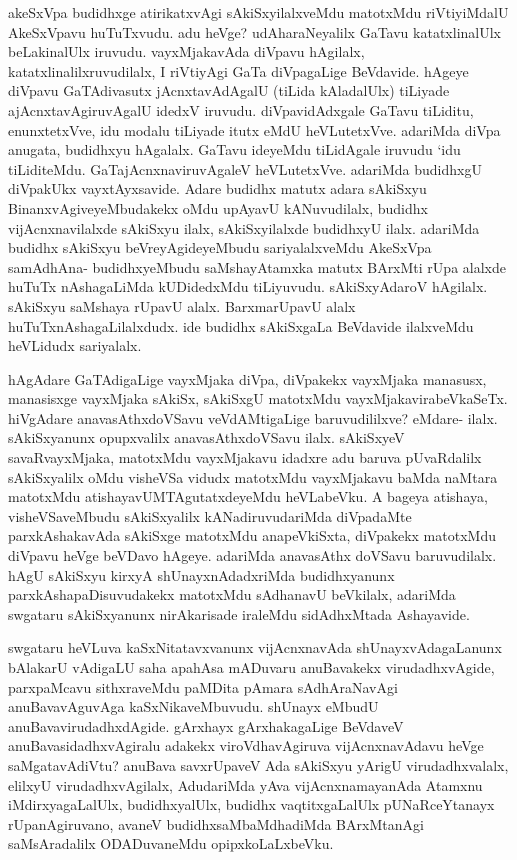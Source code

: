 \begin{artha}
akeSxVpa budidhxge atirikatxvAgi sAkiSxyilalxveMdu matotxMdu riVtiyiMdalU AkeSxVpavu huTuTxvudu. adu heVge? udAharaNeyalilx GaTavu katatxlinalUlx beLakinalUlx iruvudu. vayxMjakavAda diVpavu hAgilalx, katatxlinalilxruvudilalx, I riVtiyAgi GaTa diVpagaLige BeVdavide. hAgeye diVpavu GaTAdivasutx jAcnxtavAdAgalU (tiLida kAladalUlx) tiLiyade ajAcnxtavAgiruvAgalU idedxV iruvudu. diVpavidAdxgale GaTavu tiLiditu, enunxtetxVve, idu modalu tiLiyade itutx eMdU heVLutetxVve. adariMda diVpa anugata, budidhxyu hAgalalx. GaTavu ideyeMdu tiLidAgale iruvudu `idu tiLiditeMdu. GaTajAcnxnaviruvAgaleV heVLutetxVve. adariMda budidhxgU diVpakUkx vayxtAyxsavide. Adare budidhx matutx adara sAkiSxyu BinanxvAgiveyeMbudakekx oMdu upAyavU kANuvudilalx, budidhx vijAcnxnavilalxde sAkiSxyu ilalx, sAkiSxyilalxde budidhxyU ilalx. adariMda budidhx sAkiSxyu beVreyAgideyeMbudu sariyalalxveMdu AkeSxVpa samAdhAna- budidhxyeMbudu saMshayAtamxka matutx BArxMti rUpa alalxde huTuTx nAshagaLiMda kUDidedxMdu tiLiyuvudu. sAkiSxyAdaroV hAgilalx. sAkiSxyu saMshaya rUpavU alalx. BarxmarUpavU alalx huTuTxnAshagaLilalxdudx. ide budidhx sAkiSxgaLa BeVdavide ilalxveMdu heVLidudx sariyalalx. 
\end{artha}%

\begin{artha}
hAgAdare GaTAdigaLige vayxMjaka diVpa, diVpakekx vayxMjaka manasusx, manasisxge vayxMjaka sAkiSx, sAkiSxgU matotxMdu vayxMjakavirabeVkaSeTx. hiVgAdare anavasAthxdoVSavu veVdAMtigaLige baruvudililxve? eMdare- ilalx. sAkiSxyanunx opupxvalilx anavasAthxdoVSavu ilalx. sAkiSxyeV savaRvayxMjaka, matotxMdu vayxMjakavu idadxre adu baruva pUvaRdalilx sAkiSxyalilx oMdu visheVSa vidudx matotxMdu vayxMjakavu baMda naMtara matotxMdu atishayavUMTAgutatxdeyeMdu heVLabeVku. A bageya atishaya, visheVSaveMbudu sAkiSxyalilx kANadiruvudariMda diVpadaMte parxkAshakavAda sAkiSxge matotxMdu anapeVkiSxta, diVpakekx matotxMdu diVpavu heVge beVDavo hAgeye. adariMda anavasAthx doVSavu baruvudilalx. hAgU sAkiSxyu kirxyA shUnayxnAdadxriMda budidhxyanunx parxkAshapaDisuvudakekx matotxMdu sAdhanavU beVkilalx, adariMda swgataru sAkiSxyanunx nirAkarisade iraleMdu sidAdhxMtada Ashayavide. 
\end{artha}

\begin{artha}
swgataru heVLuva kaSxNitatavxvanunx vijAcnxnavAda shUnayxvAdagaLanunx bAlakarU vAdigaLU saha apahAsa mADuvaru anuBavakekx virudadhxvAgide, parxpaMcavu sithxraveMdu paMDita pAmara sAdhAraNavAgi anuBavavAguvAga kaSxNikaveMbuvudu. shUnayx eMbudU anuBavavirudadhxdAgide. gArxhayx gArxhakagaLige BeVdaveV anuBavasidadhxvAgiralu adakekx viroVdhavAgiruva vijAcnxnavAdavu heVge saMgatavAdiVtu? anuBava savxrUpaveV Ada sAkiSxyu yArigU virudadhxvalalx, elilxyU virudadhxvAgilalx, AdudariMda yAva vijAcnxnamayanAda Atamxnu iMdirxyagaLalUlx, budidhxyalUlx, budidhx vaqtitxgaLalUlx pUNaRceYtanayx rUpanAgiruvano, avaneV budidhxsaMbaMdhadiMda BArxMtanAgi saMsAradalilx ODADuvaneMdu opipxkoLaLxbeVku. 
\end{artha}%

